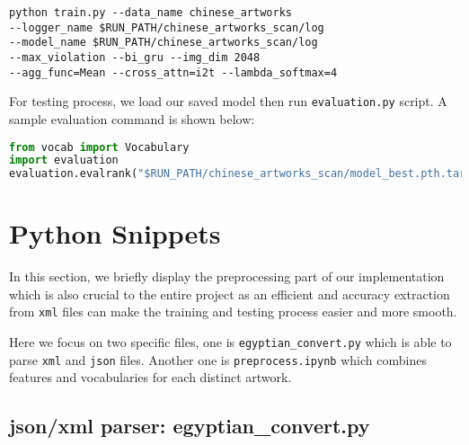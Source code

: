 \begin{lstlisting}
python train.py --data_name chinese_artworks 
--logger_name $RUN_PATH/chinese_artworks_scan/log 
--model_name $RUN_PATH/chinese_artworks_scan/log 
--max_violation --bi_gru --img_dim 2048
--agg_func=Mean --cross_attn=i2t --lambda_softmax=4
\end{lstlisting}

For testing process, we load our saved model then run \verb|evaluation.py| script. A sample evaluation command is shown below:

\begin{lstlisting}[language=python]
from vocab import Vocabulary
import evaluation
evaluation.evalrank("$RUN_PATH/chinese_artworks_scan/model_best.pth.tar", data_path="$DATA_PATH", split="test")
\end{lstlisting}



\section{Python Snippets}
In this section, we briefly display the preprocessing part of our implementation which is also crucial to the entire project as an efficient and accuracy extraction from \verb|xml| files can make the training and testing process easier and more smooth.

Here we focus on two specific files, one is \verb|egyptian_convert.py| which is able to parse \verb|xml| and \verb|json| files. Another one is \verb|preprocess.ipynb| which combines features and vocabularies for each distinct artwork.


\subsection{json/xml parser: egyptian\_convert.py}

